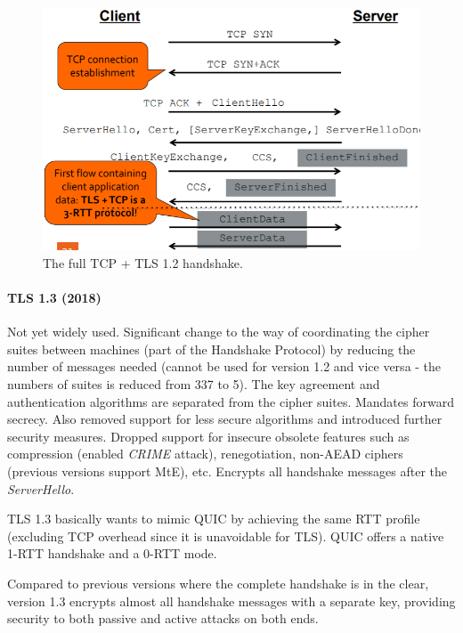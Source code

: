 \begin{figure}[h]
	\centering
	\includegraphics[scale=0.5]{images/3-poorhandshake.PNG}
	\caption{The full TCP + TLS 1.2 handshake.}
	\label{fig:poorhandshake}
\end{figure}

\paragraph{TLS 1.3 (2018)}
Not yet widely used. Significant change to the way of coordinating the cipher suites between machines (part of the Handshake Protocol) by reducing the number of messages needed (cannot be used for version 1.2 and vice versa - the numbers of suites is reduced from 337 to 5). The key agreement and authentication algorithms are separated from the cipher suites. Mandates forward secrecy. Also removed support for less secure algorithms and introduced further security measures. Dropped support for insecure obsolete features such as compression (enabled \textit{CRIME} attack), renegotiation, non-AEAD ciphers (previous versions support MtE), etc. Encrypts all handshake messages after the \textit{ServerHello}.

TLS 1.3 basically wants to mimic QUIC by achieving the same RTT profile (excluding TCP overhead since it is unavoidable for TLS). QUIC offers a native 1-RTT handshake and a 0-RTT mode.

Compared to previous versions where the complete handshake is in the clear, version 1.3 encrypts almost all handshake messages with a separate key, providing security to both passive and active attacks on both ends.

